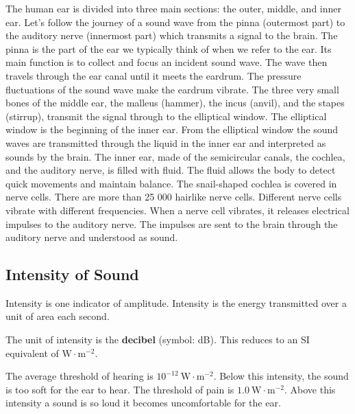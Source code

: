The human ear is divided into three main sections: the outer, middle,
and inner ear. Let's follow the journey of a sound wave from the pinna (outermost part) to the auditory nerve (innermost part) which transmits a signal to the brain. The pinna  is the part of the ear we typically think of when we refer to the ear. Its main
function is to collect and focus an incident sound wave. The wave
then travels through the ear canal until it meets the eardrum. The
pressure fluctuations of the sound wave make the eardrum vibrate.
The three very small bones of the middle ear, the malleus (hammer),
the incus (anvil), and the stapes (stirrup), transmit the signal through
to the elliptical window. The elliptical window is the beginning of the
inner ear. From the elliptical window the sound waves are transmitted through the liquid
in the inner ear and interpreted as sounds by the brain.
The inner ear, made of the semicircular canals, the cochlea,
and the auditory nerve, is filled with fluid. The fluid allows the body to
detect quick movements and maintain balance. The snail-shaped cochlea
is covered in nerve cells. There are more than 25 000 hairlike
nerve cells. Different nerve cells vibrate with different
frequencies. When a nerve cell vibrates, it releases electrical impulses
to the auditory nerve. The impulses are sent to the brain through the
auditory nerve and understood as sound.

\subsection{Intensity of Sound}
Intensity is one indicator of amplitude. Intensity is the energy transmitted over a unit of area each second.


The unit of intensity is the \textbf{decibel} (symbol: dB). This reduces to an SI equivalent of $\mathrm{W \cdot m^{-2}}$.

The average threshold of hearing is $10^{-12}~\mathrm{W\cdot m^{-2}}$. Below this intensity, the sound is too soft for the ear to hear. The threshold of pain is $1.0~\mathrm{W\cdot m^{-2}}$. Above this intensity a sound is so loud it becomes uncomfortable for
the ear.

